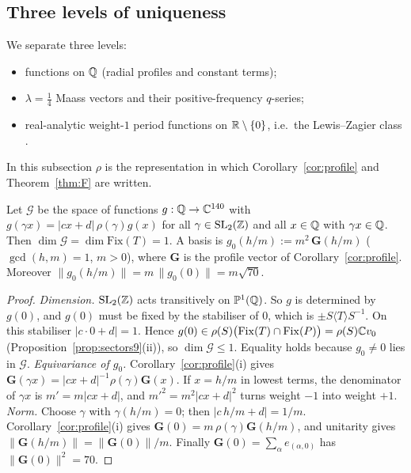 \subsection{Three levels of uniqueness}\label{sec:levels}
We separate three levels:
\begin{itemize}
\item[($\kappa$)] functions on $\mathbb{Q}$ (radial profiles and constant terms);
\item[($u$)] $\lambda=\tfrac14$ Maass vectors and their positive-frequency $q$-series;
\item[($\Phi$)] real-analytic weight-$1$ period functions on $\mathbb{R}\setminus\{0\}$, i.e.\ the Lewis--Zagier class \cite{LZ}.
\end{itemize}
In this subsection $\rho$ is the representation in which Corollary~\ref{cor:profile} and Theorem~\ref{thm:F} are written.

\begin{proposition}\label{prop:U1}
Let $\mathcal G$ be the space of functions $g:\mathbb{Q}\to\mathbb{C}^{140}$ with $g(\gamma x)=|cx+d|\,\rho(\gamma)g(x)$ for all $\gamma\in\mathrm{SL}_2(\mathbb{Z})$ and all $x\in\mathbb{Q}$ with $\gamma x\in\mathbb{Q}$. Then $\dim\mathcal G=\dim\mathrm{Fix}(T)=1$. A basis is $g_0(h/m):=m^2\,\mathbf G(h/m)$ ($\gcd(h,m)=1$, $m>0$), where $\mathbf G$ is the profile vector of Corollary~\ref{cor:profile}. Moreover $\|g_0(h/m)\|=m\,\|g_0(0)\|=m\sqrt{70}$.
\end{proposition}
\begin{proof}
\emph{Dimension.} $\mathrm{SL}_2(\mathbb{Z})$ acts transitively on $\mathbb P^1(\mathbb{Q})$. So $g$ is determined by $g(0)$, and $g(0)$ must be fixed by the stabiliser of $0$, which is $\pm S\langle T\rangle S^{-1}$. On this stabiliser $|c\cdot0+d|=1$. Hence $g(0)\in\rho(S)\bigl(\mathrm{Fix}(T)\cap\mathrm{Fix}(P)\bigr)=\rho(S)\mathbb{C} v_0$ (Proposition~\ref{prop:sectors9}(ii)), so $\dim\mathcal G\le1$. Equality holds because $g_0\neq0$ lies in $\mathcal G$.
\emph{Equivariance of $g_0$.} Corollary~\ref{cor:profile}(i) gives $\mathbf G(\gamma x)=|cx+d|^{-1}\rho(\gamma)\mathbf G(x)$. If $x=h/m$ in lowest terms, the denominator of $\gamma x$ is $m'=m|cx+d|$, and $m'^2=m^2|cx+d|^2$ turns weight $-1$ into weight $+1$.
\emph{Norm.} Choose $\gamma$ with $\gamma(h/m)=0$; then $|c\,h/m+d|=1/m$. Corollary~\ref{cor:profile}(i) gives $\mathbf G(0)=m\,\rho(\gamma)\mathbf G(h/m)$, and unitarity gives $\|\mathbf G(h/m)\|=\|\mathbf G(0)\|/m$. Finally $\mathbf G(0)=\sum_\alpha e_{(\alpha,0)}$ has $\|\mathbf G(0)\|^2=70$.
\end{proof}

